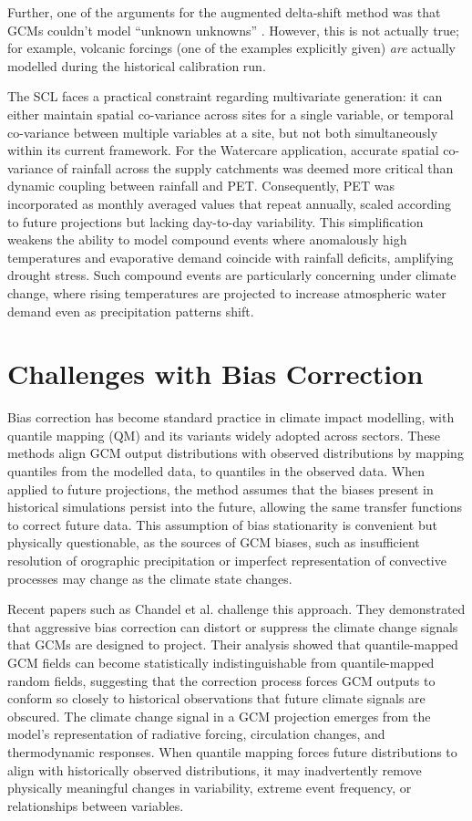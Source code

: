 Further, one of the arguments for the augmented delta-shift method was that GCMs couldn't model ``unknown 
unknowns'' \cite{tnt}. However, this is not actually true; for example, volcanic forcings (one of
the examples explicitly given) \textit{are} actually modelled during the historical calibration
run.

The SCL faces a practical constraint regarding multivariate generation: it can either maintain 
spatial co-variance across sites for a single variable, or temporal co-variance between 
multiple variables at a site, but not both simultaneously within its current framework. For the 
Watercare application, accurate spatial co-variance of rainfall across the supply catchments 
was deemed more critical than dynamic coupling between rainfall and PET. Consequently, PET was 
incorporated as monthly averaged values that repeat annually, scaled according to future 
projections but lacking day-to-day variability. This simplification weakens the ability to 
model compound events where anomalously high temperatures and evaporative demand coincide with 
rainfall deficits, amplifying drought stress. Such compound events are particularly concerning 
under climate change, where rising temperatures are projected to increase atmospheric water 
demand even as precipitation patterns shift.

\section{Challenges with Bias Correction}

Bias correction has become standard practice in climate impact modelling, with quantile 
mapping (QM) and its variants widely adopted across sectors. These methods align GCM output 
distributions with observed distributions by mapping quantiles from the modelled data, to 
quantiles 
in the observed data. When applied to future projections, the method assumes that 
the biases present in historical simulations persist into the future, allowing the same 
transfer functions to correct future data. This assumption of bias stationarity is convenient 
but physically questionable, as the sources of GCM biases, such as insufficient resolution of 
orographic precipitation or imperfect representation of convective processes may change as 
the climate state changes.

Recent papers such as Chandel et al. \cite{Chandel_2024} challenge this approach.
They demonstrated that aggressive bias 
correction can distort or suppress the climate change signals that GCMs are designed to project. 
Their analysis showed that quantile-mapped GCM fields can become statistically 
indistinguishable from quantile-mapped random fields, suggesting that the correction process 
forces GCM outputs to conform so closely to historical observations that future climate signals 
are obscured. The climate change signal in a GCM projection emerges from the model's 
representation of radiative forcing, circulation changes, and thermodynamic responses. When 
quantile mapping forces future distributions to align with historically observed distributions, 
it may inadvertently remove physically meaningful changes in variability, extreme event 
frequency, or relationships between variables.

